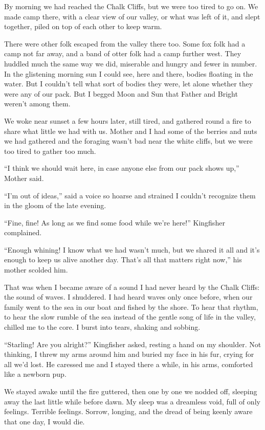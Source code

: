 \secdiv

\noindent By morning we had reached the Chalk Cliffs, but we were too tired to go on. We made camp there, with a clear view of our valley, or what was left of it, and slept together, piled on top of each other to keep warm.

There were other folk escaped from the valley there too. Some fox folk had a camp not far away, and a band of otter folk had a camp further west. They huddled much the same way we did, miserable and hungry and fewer in number. In the glistening morning sun I could see, here and there, bodies floating in the water. But I couldn't tell what sort of bodies they were, let alone whether they were any of our pack. But I begged Moon and Sun that Father and Bright weren't among them.

We woke near sunset a few hours later, still tired, and gathered round a fire to share what little we had with us. Mother and I had some of the berries and nuts we had gathered and the foraging wasn't bad near the white cliffs, but we were too tired to gather too much.

``I think we should wait here, in case anyone else from our pack shows up,'' Mother said.

``I'm out of ideas,'' said a voice so hoarse and strained I couldn't recognize them in the gloom of the late evening.

``Fine, fine! As long as we find some food while we're here!'' Kingfisher complained.

``Enough whining! I know what we had wasn't much, but we shared it all and it's enough to keep us alive another day. That's all that matters right now,'' his mother scolded him.

That was when I became aware of a sound I had never heard by the Chalk Cliffs: the sound of waves. I shuddered. I had heard waves only once before, when our family went to the sea in our boat and fished by the shore. To hear that rhythm, to hear the slow rumble of the sea instead of the gentle song of life in the valley, chilled me to the core. I burst into tears, shaking and sobbing.

``Starling! Are you alright?'' Kingfisher asked, resting a hand on my shoulder. Not thinking, I threw my arms around him and buried my face in his fur, crying for all we'd lost. He caressed me and I stayed there a while, in his arms, comforted like a newborn pup.

We stayed awake until the fire guttered, then one by one we nodded off, sleeping away the last little while before dawn. My sleep was a dreamless void, full of only feelings. Terrible feelings. Sorrow, longing, and the dread of being keenly aware that one day, I would die.

